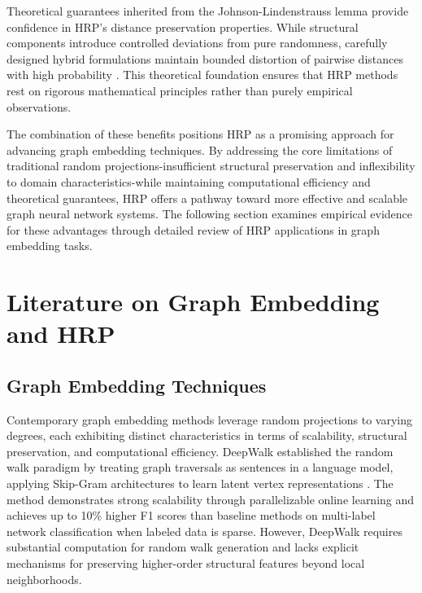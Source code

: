 \documentclass[conference]{IEEEtran}
\begin{document}
Theoretical guarantees inherited from the Johnson-Lindenstrauss lemma provide confidence in HRP's distance preservation properties. While structural components introduce controlled deviations from pure randomness, carefully designed hybrid formulations maintain bounded distortion of pairwise distances with high probability \cite{johnson1984, yahaya2025hrp}. This theoretical foundation ensures that HRP methods rest on rigorous mathematical principles rather than purely empirical observations.

The combination of these benefits positions HRP as a promising approach for advancing graph embedding techniques. By addressing the core limitations of traditional random projections-insufficient structural preservation and inflexibility to domain characteristics-while maintaining computational efficiency and theoretical guarantees, HRP offers a pathway toward more effective and scalable graph neural network systems. The following section examines empirical evidence for these advantages through detailed review of HRP applications in graph embedding tasks.

\section{Literature on Graph Embedding and HRP}

\subsection{Graph Embedding Techniques}

Contemporary graph embedding methods leverage random projections to varying degrees, each exhibiting distinct characteristics in terms of scalability, structural preservation, and computational efficiency. DeepWalk established the random walk paradigm by treating graph traversals as sentences in a language model, applying Skip-Gram architectures to learn latent vertex representations \cite{perozzi2014}. The method demonstrates strong scalability through parallelizable online learning and achieves up to 10\% higher F1 scores than baseline methods on multi-label network classification when labeled data is sparse. However, DeepWalk requires substantial computation for random walk generation and lacks explicit mechanisms for preserving higher-order structural features beyond local neighborhoods.
\end{document}
